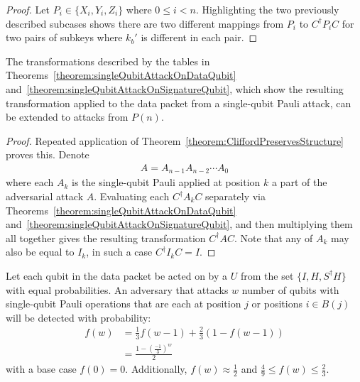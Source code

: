 \begin{proof}
Let $P_i \in \{X_i, Y_i, Z_i\}$ where $0 \leq i < n$. Highlighting the two previously described subcases shows there are two different mappings from $P_{i}$ to $C^{\dagger} P_i C$ for two pairs of subkeys where $k_b'$ is different in each pair.
\end{proof}

\begin{theorem}
\label{theorem:extendingSingleQubitAttackToMultiQubitAttack}
The transformations described by the tables in Theorems~\ref{theorem:singleQubitAttackOnDataQubit} and~\ref{theorem:singleQubitAttackOnSignatureQubit}, which show the resulting transformation applied to the data packet from a single-qubit Pauli attack, can be extended to attacks from $P(n)$.
\end{theorem}
\begin{proof}
Repeated application of Theorem~\ref{theorem:CliffordPreservesStructure} proves this. Denote 
\begin{align}
A = A_{n-1}A_{n-2} \cdots A_{0}
\end{align}
where each $A_k$ is the single-qubit Pauli applied at position $k$ a part of the adversarial attack $A$. Evaluating each $C^{\dagger}A_kC$ separately via Theorems~\ref{theorem:singleQubitAttackOnDataQubit} and~\ref{theorem:singleQubitAttackOnSignatureQubit}, and then multiplying them all together gives the resulting transformation $C^{\dagger}AC$. Note that any of $A_k$ may also be equal to $I_k$, in such a case $C^{\dagger}I_kC = I$.
\end{proof}
\begin{theorem}
\label{theorem:probabilityOfMultiQubitDetectionOnSingleBlock}
Let each qubit in the data packet be acted on by a $U$ from the set $\{I, H, S^{\dagger}H\}$ with equal probabilities. An adversary that attacks $w$ number of qubits with single-qubit Pauli operations that are each at position $j$ or positions $i \in B(j)$ will be detected with probability:
\begin{align}
f(w) &= \frac{1}{3}f(w - 1) + \frac{2}{3}(1 - f(w - 1))\\ \label{eq:probabilityOfMultiQubitDetectionOnSingleBlock}
&= \frac{1-(\frac{-1}{3})^w}{2} 
\end{align}
with a base case $f(0) = 0$. Additionally, $f(w) \approx \frac{1}{2}$ and $\frac{4}{9} \leq f(w) \leq \frac{2}{3}$.
\end{theorem}
